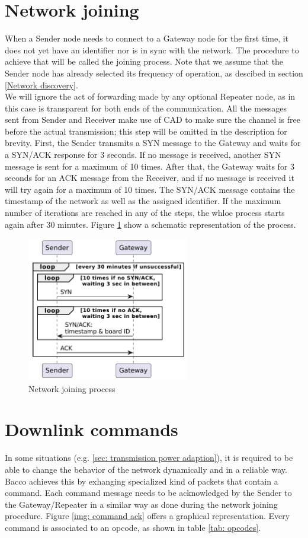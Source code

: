 \section{Network joining}
When a Sender node needs to connect to a Gateway node for the first time, it does not yet have an identifier nor is in
sync with the network. The procedure to achieve that will be called the joining process. Note that we assume that the
Sender node has already selected its frequency of operation, as descibed in section \ref{Network discovery}.\\
We will ignore the act of forwarding made by any optional Repeater node, as in this case is transparent for both ends of the
communication. All the messages sent from Sender and Receiver make use of CAD to make sure the channel is free before
the actual transmission; this step will be omitted in the description for brevity. First, the Sender transmits a SYN
message to the Gateway and waits for a SYN/ACK response for 3 seconds. If no message is received, another SYN message
is sent for a maximum of 10 times. After that, the Gateway waits for 3 seconds for an ACK message from the Receiver, and
if no message is received it will try again for a maximum of 10 times. The SYN/ACK message contains the timestamp of
the network as well as the assigned identifier. If the maximum number of iterations are reached in any of the steps, the
whloe process starts again after 30 minutes. Figure \ref{img: network joining} show a schematic representation of the process.

\begin{figure}[ht]
    \centering
    \includegraphics[width=200pt]{uml/network_joining.pdf}
    \caption{Network joining process}
    \label{img: network joining}
\end{figure}

\section{Downlink commands}
In some situations (e.g. \ref{sec: transmission power adaption}), it is required to be able to change the behavior of the
network dynamically and in a reliable way. Bacco achieves this by exhanging specialized kind of packets that contain a
command. Each command message needs to be acknowledged by the Sender to the Gateway/Repeater in a similar way as done during the
network joining procedure. Figure \ref{img: command ack} offers a graphical representation. Every command is associated
to an opcode, as shown in table \ref{tab: opcodes}.\\


